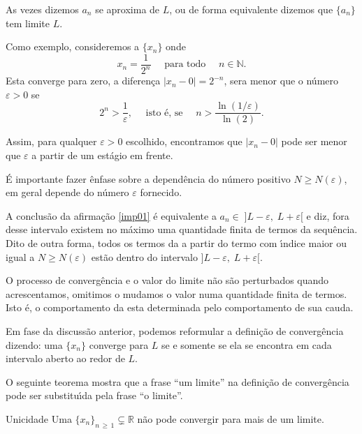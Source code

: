 As vezes  dizemos $a_n$  se aproxima de $L$, ou de forma equivalente dizemos que $\{a_n\}$ tem limite $L$.

Como exemplo, consideremos a \seq $\{x_n\}$ onde
\begin{equation*}
x_n=\dfrac{1}{2^n} \quad \text{ para todo } \quad n\in \mathbb{N}.
\end{equation*}
Esta \seq converge para zero, a diferen\c{c}a $|x_n-0|=2^{-n}$, sera menor que o n\'{u}mero $\varepsilon>0$ se
\begin{equation*}
2^n>\dfrac{1}{\varepsilon}, \quad  \text{ isto \'{e}, se } \quad n> \dfrac{\ln(1/\varepsilon)}{\ln(2)}.
\end{equation*}

Assim, para qualquer $\varepsilon>0$ escolhido, encontramos que $|x_n-0|$ pode ser menor que $\varepsilon$ a partir de um est\'{a}gio em frente.

\begin{note}
\'{E} importante fazer \^{e}nfase sobre a depend\^{e}ncia do n\'{u}mero positivo $N\geq N(\varepsilon)$, em geral depende do n\'{u}mero $\varepsilon$ fornecido.

A conclus\~{a}o da afirma\c{c}\~{a}o \eqref{imp01} \'{e} equivalente a $a_n\in\; ]L-\varepsilon,\; L+\varepsilon[$ e diz, fora desse intervalo existem no m\'{a}ximo uma quantidade finita de termos da sequ\^{e}ncia. Dito de outra forma, todos os termos da \seq a partir do termo com \'{\i}ndice maior ou igual a $N\geq N(\varepsilon)$ est\~{a}o dentro do intervalo $]L-\varepsilon,\; L+\varepsilon[$.

O processo de converg\^{e}ncia e o valor do limite  n\~{a}o s\~{a}o perturbados quando acrescentamos, omitimos o mudamos o valor numa quantidade finita de termos. Isto \'{e}, o comportamento da \seq esta determinada pelo comportamento de sua cauda.

Em fase da discuss\~{a}o anterior, podemos reformular a defini\c{c}\~{a}o de converg\^{e}ncia dizendo: uma \seq  $\{x_n\}$ converge para $L$ se e somente se ela se encontra em cada intervalo aberto ao redor de $L$.
\end{note}

O seguinte teorema mostra que a frase ``um limite'' na defini\c{c}\~{a}o de 
converg\^{e}ncia pode ser substitu\'{\i}da pela frase ``o limite''.

\begin{theoc}{Unicidade}{}
Uma \seq $\{x_n\}_{n\, \geq\, 1} \subsetneq \mathbb{R}$ n\~{a}o pode convergir para mais de um limite.
\end{theoc}

